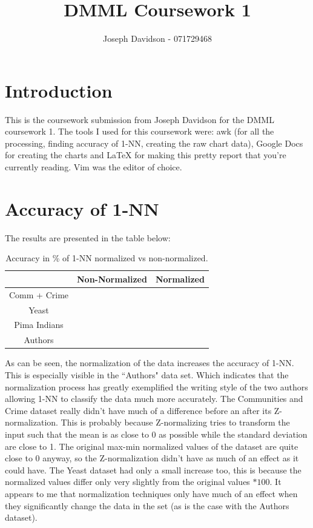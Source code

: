 \documentclass[a4paper,10pt]{article}
\title{DMML Coursework 1}
\author{Joseph Davidson - 071729468}
\date{}
\begin{document}
  \maketitle

  \section{Introduction}
    This is the coursework submission from Joseph Davidson for the DMML
    coursework 1. The tools I used for this coursework were: awk (for all the
    processing, finding accuracy of 1-NN, creating the raw chart data),
    Google Docs for creating the charts and \LaTeX{} for making this pretty 
    report that you're currently reading. Vim was the editor of choice.

  \section{Accuracy of 1-NN}

    The results are presented in the table below:

    \begin{table}[hc]
      \centering
      \caption{Accuracy in \% of 1-NN normalized vs non-normalized.} \indent
      \begin{tabular}{|c|c|c|}
        \hline
                      & \textbf{Non-Normalized} & \textbf{Normalized} \\ \hline
        Comm + Crime  &                  &              \\ 
        Yeast         &                  &              \\
        Pima Indians  &                  &              \\ 
        Authors       &                  &              \\
        \hline
      \end{tabular}
    \end{table}
    As can be seen, the normalization of the data increases the accuracy of 1-NN. This is
    especially visible in the ``Authors" data set. Which indicates that the normalization process
    has greatly exemplified the writing style of the two authors allowing 1-NN to classify the data
    much more accurately.
    The Communities and Crime dataset really didn't have much of a difference before an after its Z-normalization.
    This is probably because Z-normalizing tries to transform the input such that the mean is as close to 0 as
    possible while the standard deviation are close to 1. The original max-min normalized values of the dataset
    are quite close to 0 anyway, so the Z-normalization didn't have as much of an effect as it could have.
    The Yeast dataset had only a small increase too, this is because the normalized values differ only very
    slightly from the original values $*100$. It appears to me that normalization techniques only have much
    of an effect when they significantly change the data in the set (as is the case with the Authors dataset). 
\end{document}
